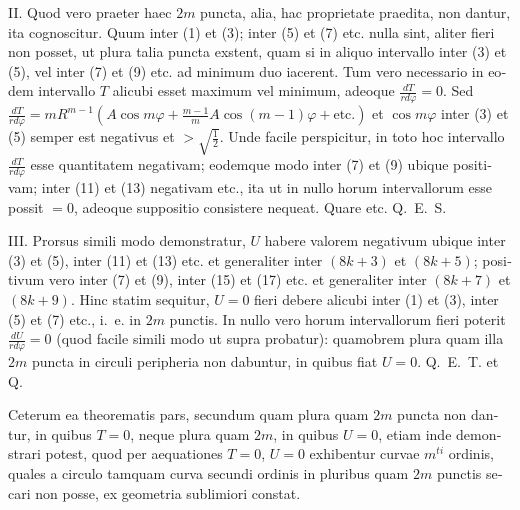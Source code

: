 \documentclass[12pt,a4paper]{article}
\begin{document}
\begin{otherlanguage}{latin}
II. Quod vero praeter haec $2m$ puncta, alia, hac proprietate praedita, non dantur, ita cognoscitur. Quum inter (1) et (3); inter (5) et (7) etc. nulla sint, aliter fieri non posset, ut plura talia puncta exstent, quam si in aliquo intervallo inter (3) et (5), vel inter (7) et (9) etc. ad minimum duo iacerent. Tum vero necessario in eodem intervallo $T$ alicubi esset maximum vel minimum, adeoque $\frac{dT}{rd\varphi}=0$. Sed $\frac{dT}{rd\varphi}=mR^{m-1}(A\cos m\varphi+\frac{m-1}{m}A\cos(m-1)\varphi+\text{etc.})$ et $\cos m\varphi$ inter (3) et (5) semper est negativus et $>\sqrt{\tfrac{1}{2}}$. Unde facile perspicitur, in toto hoc intervallo $\frac{dT}{rd\varphi}$ esse quantitatem negativam; eodemque modo inter (7) et (9) ubique positivam; inter (11) et (13) negativam etc., ita ut in nullo horum intervallorum esse possit $=0$, adeoque suppositio consistere nequeat. Quare etc. Q.~E.~S.

III. Prorsus simili modo demonstratur, $U$ habere valorem negativum ubique inter (3) et (5), inter (11) et (13) etc. et generaliter inter $(8k+3)$ et $(8k+5)$; positivum vero inter (7) et (9), inter (15) et (17) etc. et generaliter inter $(8k+7)$ et $(8k+9)$. Hinc statim sequitur, $U=0$ fieri debere alicubi inter (1) et (3), inter (5) et (7) etc., i.~e. in $2m$ punctis. In nullo vero horum intervallorum fieri poterit $\frac{dU}{rd\varphi}=0$ (quod facile simili modo ut supra probatur): quamobrem plura quam illa $2m$ puncta in circuli peripheria non dabuntur, in quibus fiat $U=0$. Q.~E.~T. et Q.

Ceterum ea theorematis pars, secundum quam plura quam $2m$ puncta non dantur, in quibus $T=0$, neque plura quam $2m$, in quibus $U=0$, etiam inde demonstrari potest, quod per aequationes $T=0$, $U=0$ exhibentur curvae $m^{ti}$ ordinis, quales a circulo tamquam curva secundi ordinis in pluribus quam $2m$ punctis secari non posse, ex geometria sublimiori constat.


\end{otherlanguage}
\end{document}
